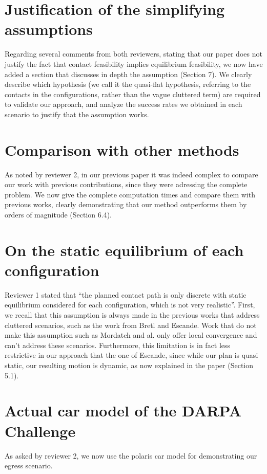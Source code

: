 \documentclass[12pt]{article}
\begin{document}
\section{Justification of the simplifying assumptions}
Regarding several comments from both reviewers, stating that our paper does not justify the fact that contact feasibility implies equilibrium feasibility,
we now have added a section that discusses in depth the assumption (Section 7). We clearly describe which hypothesis (we call it the quasi-flat hypothesis, referring
to the contacts in the configurations, rather than the vague cluttered term) are required to validate our approach, and analyze
the success rates we obtained in each scenario to justify that the assumption works.

\section{Comparison with other methods}
As noted by reviewer 2, in our previous paper it was indeed complex to compare our work with previous contributions,
since they were adressing the complete problem. We now give the complete computation times and compare them with previous works,
clearly demonstrating that our method outperforms them by orders of magnitude (Section 6.4).


\section{On the static equilibrium of each configuration}
Reviewer 1 stated that ``the planned contact path is only discrete with static equilibrium considered for each
configuration, which is not very realistic''. First, we recall that this assumption is always made in the previous works that address cluttered scenarios,
such as the work from Bretl and Escande. Work that do not make this assumption such as Mordatch and al. only offer local convergence and can't address these scenarios. Furthermore, this limitation is in fact less restrictive in our approach that the one of Escande, since while our plan is quasi static, our resulting motion is dynamic, as now explained in the paper (Section 5.1). 

\section{Actual car model of the DARPA Challenge}
As asked by reviewer 2, we now use the polaris car model for demonstrating our egress scenario.
\end{document}
